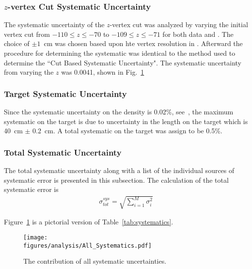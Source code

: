 \subsubsection{$z$-vertex Cut Systematic Uncertainty}
The systematic uncertainty of the $z$-vertex cut was analyzed by varying the initial vertex cut from $-110 \le z \le -70$ to $-109 \le z \le -71$ for both data and . The choice of $\pm 1$~cm was chosen based upon hte vertex resolution in . Afterward the procedure for determining the systematic was identical to the method used to determine the ``Cut Based Systematic Uncertainty". The systematic uncertainty from varying the $z$ was 0.0041, shown in Fig.~\ref{fig:results.syserr}

\subsubsection{Target Systematic Uncertainty}
Since the systematic uncertainty on the density is 0.02\%, see~\cite{g12note}, the maximum systematic on the target is due to uncertainty in the length on the target which is 40~cm $\pm$ 0.2~cm. A total systematic on the target was assign to be 0.5\%. 

\subsubsection{Total Systematic Uncertainty}
The total systematic uncertainty along with a list of the individual sources of systematic error is presented in this subsection. The calculation of the total systematic error is 
\begin{align}
\sigma^{sys}_{tot} = \sqrt{\sum_{i=1}^{M}\sigma_i^2}
\end{align}

Figure~\ref{fig:results.syserr} is a pictorial version of Table~\ref{tab:systematics}.
\begin{figure}[h!]\begin{center}
\texttt{[image: \\figures/analysis/All\_Systematics.pdf]}
\caption[The contribution of all systematic uncertainties]{\label{fig:results.syserr}The contribution of all systematic uncertainties.}
\end{center}\end{figure}
\FloatBarrier

